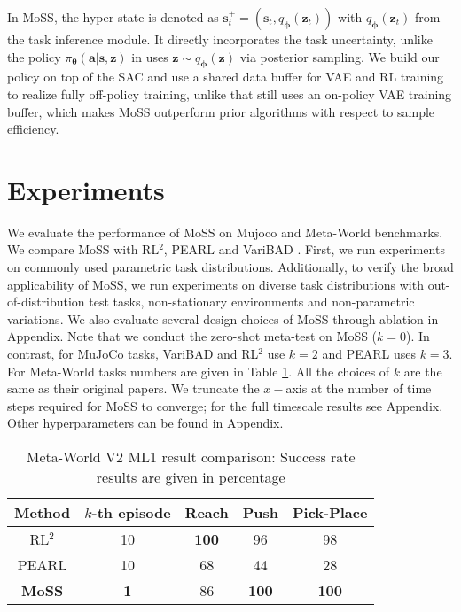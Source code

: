 \documentclass[letterpaper]{article} %
\begin{document}
In MoSS, the hyper-state is denoted as $\bm s_{t}^{+} = (\bm s_{t}, q_{\bm \phi}(\bm z_{t}))$ with $q_{\bm \phi}(\bm z_{t})$ from the task inference module. It directly incorporates the task uncertainty, unlike the policy $\pi_{\bm \theta}(\bm a|\bm s, \bm z)$ in \cite{MAESN, PEARL, MELD} uses $\bm z \sim q_{\bm \phi}(\bm z)$ via posterior sampling. We build our policy on top of the SAC \cite{SAC-1} and use a shared data buffer for VAE and RL training to realize fully off-policy training, unlike \cite{PEARL} that still uses an on-policy VAE training buffer, which makes MoSS outperform prior algorithms with respect to sample efficiency.




\section{Experiments}
\label{sec:experiments}
We evaluate the performance of MoSS on Mujoco \cite{Mujoco} and Meta-World \cite{MetaWorld} benchmarks. We compare MoSS with RL$^{2}$, PEARL and VariBAD \cite{RL2, PEARL, VariBAD}. First, we run experiments on commonly used parametric task distributions. Additionally, to verify the broad applicability of MoSS, we run experiments on diverse task distributions with out-of-distribution test tasks, non-stationary environments and non-parametric variations. We also evaluate several design choices of MoSS through ablation in Appendix. Note that we conduct the zero-shot meta-test on MoSS ($k=0$). In contrast, for MuJoCo tasks, VariBAD and RL$^{2}$ use $k=2$ and PEARL uses $k=3$. For Meta-World tasks numbers are given in Table \ref{tab:meta-world-result}. All the choices of $k$ are the same as their original papers.  We truncate the $x-$axis at the number of time steps required for MoSS to converge; for the full timescale results see Appendix. Other hyperparameters can be found in Appendix.



\begin{table}[htbp]
  \centering
    \begin{tabular}{c|c|c|c|c}
    \toprule
    Method & $k$-th episode & Reach & Push  & Pick-Place \\
    \midrule
    RL$^{2}$   & 10    & \textbf{100} & 96 & 98 \\
    PEARL & 10    & 68    & 44    & 28 \\
    \textbf{MoSS} & \textbf{1}     & 86    & \textbf{100}    & \textbf{100} \\
    \bottomrule
    \end{tabular}%
  \caption{Meta-World V2 ML1 result comparison: Success rate results are given in percentage\footnotemark}
  \label{tab:meta-world-result}
\end{table}
\end{document}
